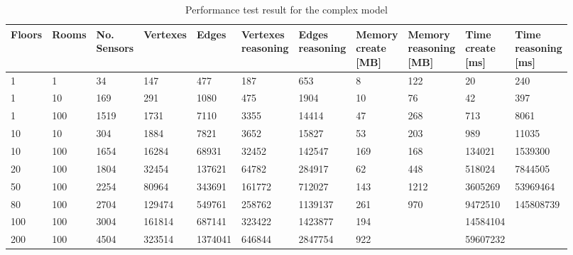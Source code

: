 \begin{table}
\centering
\caption{Performance test result for the complex model}
\label{tab:perf_complex}
\begin{adjustbox}{max width=\textwidth}
\begin{tabular}{lll|llll|llll}
\textbf{Floors} & \textbf{Rooms} & \specialcell{\textbf{No.}\\\textbf{Sensors}} & \textbf{Vertexes} & \textbf{Edges} & \specialcell{\textbf{Vertexes}\\\textbf{reasoning}} & \specialcell{\textbf{Edges}\\\textbf{reasoning}} & \specialcell{\textbf{Memory}\\\textbf{create}\\\textbf{{[}MB{]}}} & \specialcell{\textbf{Memory}\\\textbf{reasoning}\\\textbf{{[}MB{]}}} & \specialcell{\textbf{Time}\\\textbf{create}\\\textbf{{[}ms{]}}} & \specialcell{\textbf{Time}\\\textbf{reasoning}\\\textbf{{[}ms{]}}} \\\hline
1 & 1 & 34 & 147 & 477 & 187 & 653 & 8 & 122 & 20 & 240 \\
1 & 10 & 169 & 291 & 1080 & 475 & 1904 & 10 & 76 & 42 & 397 \\
1 & 100 & 1519 & 1731 & 7110 & 3355 & 14414 & 47 & 268 & 713 & 8061 \\
10 & 10 & 304 & 1884 & 7821 & 3652 & 15827 & 53 & 203 & 989 & 11035 \\
10 & 100 & 1654 & 16284 & 68931 & 32452 & 142547 & 169 & 168 & 134021 & 1539300 \\
20 & 100 & 1804 & 32454 & 137621 & 64782 & 284917 & 62 & 448 & 518024 & 7844505 \\
50 & 100 & 2254 & 80964 & 343691 & 161772 & 712027 & 143 & 1212 & 3605269 & 53969464 \\
80 & 100 & 2704 & 129474 & 549761 & 258762 & 1139137 & 261 & 970 & 9472510 & 145808739 \\
100 & 100 & 3004 & 161814 & 687141 & 323422 & 1423877 & 194 &  & 14584104 &  \\
200 & 100 & 4504 & 323514 & 1374041 & 646844 & 2847754 & 922 &  & 59607232 &
\end{tabular}
\end{adjustbox}
\end{table}
